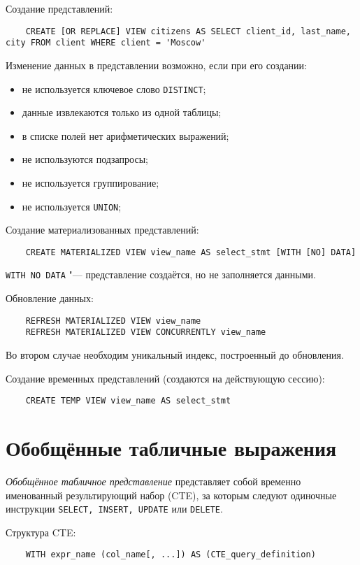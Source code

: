 Создание представлений:
\begin{verbatim}
	CREATE [OR REPLACE] VIEW citizens AS SELECT client_id, last_name, city FROM client WHERE client = 'Moscow'
\end{verbatim}

Изменение данных в представлении возможно, если при его создании:
\begin{itemize}
	\item не используется ключевое слово \texttt{DISTINCT};
	\item данные извлекаются только из одной таблицы;
	\item в списке полей нет арифметических выражений;
	\item не используются подзапросы;
	\item не используется группирование;
	\item не используется \texttt{UNION};
\end{itemize}

Создание материализованных представлений:
\begin{verbatim}
	CREATE MATERIALIZED VIEW view_name AS select_stmt [WITH [NO] DATA]
\end{verbatim}
\texttt{WITH NO DATA} "--- представление создаётся, но не заполняется данными.

Обновление данных:
\begin{verbatim}
	REFRESH MATERIALIZED VIEW view_name
	REFRESH MATERIALIZED VIEW CONCURRENTLY view_name
\end{verbatim}
Во втором случае необходим уникальный индекс, построенный до обновления.

Создание временных представлений (создаются на действующую сессию):
\begin{verbatim}
	CREATE TEMP VIEW view_name AS select_stmt
\end{verbatim}

\section{Обобщённые табличные выражения}

\begin{definition}
	\emph{Обобщённое табличное представление} представляет собой временно именованный результирующий набор (CTE), за которым следуют одиночные инструкции \texttt{SELECT, INSERT, UPDATE} или \texttt{DELETE}.
\end{definition}

Структура CTE:
\begin{verbatim}
	WITH expr_name (col_name[, ...]) AS (CTE_query_definition)
\end{verbatim}

